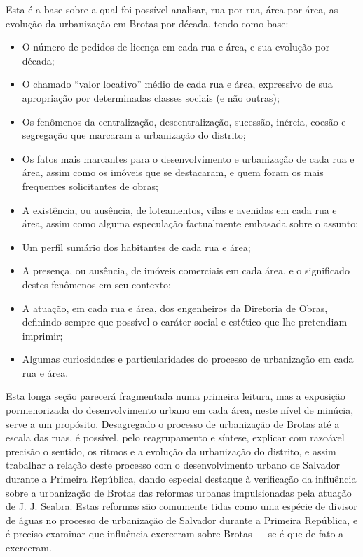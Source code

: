 Esta é a base sobre a qual foi possível analisar, rua por rua, área por área, as evolução da urbanização em Brotas por década, tendo como base:

\begin{itemize}
\item O número de pedidos de licença em cada rua e área, e sua evolução por década;
\item O chamado ``valor locativo'' médio de cada rua e área, expressivo de sua apropriação por determinadas classes sociais (e não outras);
\item Os fenômenos da centralização, descentralização, sucessão, inércia, coesão e segregação que marcaram a urbanização do distrito; 
\item Os fatos mais marcantes para o desenvolvimento e urbanização de cada rua e área, assim como os imóveis que se destacaram, e quem foram os mais frequentes solicitantes de obras;
\item A existência, ou ausência, de loteamentos, vilas e avenidas em cada rua e área, assim como alguma especulação factualmente embasada sobre o assunto; 
\item Um perfil sumário dos habitantes de cada rua e área;
\item A presença, ou ausência, de imóveis comerciais em cada área, e o significado destes fenômenos em seu contexto;
\item A atuação, em cada rua e área, dos engenheiros da Diretoria de Obras, definindo sempre que possível o caráter social e estético que lhe pretendiam imprimir;
\item Algumas curiosidades e particularidades do processo de urbanização em cada rua e área.
\end{itemize}

Esta longa seção parecerá fragmentada numa primeira leitura, mas a exposição pormenorizada do desenvolvimento urbano em cada área, neste nível de minúcia, serve a um propósito. Desagregado o processo de urbanização de Brotas até a escala das ruas, é possível, pelo reagrupamento e síntese, explicar com razoável precisão o sentido, os ritmos e a evolução da urbanização do distrito, e assim trabalhar a relação deste processo com o desenvolvimento urbano de Salvador durante a Primeira República, dando especial destaque à verificação da influência sobre a urbanização de Brotas das reformas urbanas impulsionadas pela atuação de J. J. Seabra. Estas reformas são comumente tidas como uma espécie de divisor de águas no processo de urbanização de Salvador durante a Primeira República, e é preciso examinar que influência exerceram sobre Brotas --- se é que de fato a exerceram.

